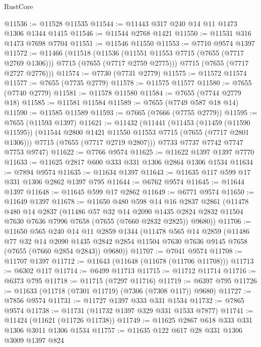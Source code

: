 \begin{lexlean}{RustCore}
\begin{coremodule}
@11536 := @11528 @11535
@11544 := @11443 @317 @240 @14 @11 @1473 @1306 @1344 @1415
@11546 := @11544 @2768 @1421
@11550 := @11531 @316 @1473 @7698 @7704
@11551 := @11546 @11550
@11553 := @7710 @9574 @1397
@11572 := @11466
    (@11518
      (@11536 (@11551 @11553 @7715 (@7655 (@7717 @2769 @1306))) @7715 (@7655 (@7717 @2759 @2775)))
      @7715
      (@7655 (@7717 @2727 @2776)))
@11574 := @7730 (@7731 @2779)
@11575 := @11572 @11574
@11577 := @7655 (@7735 @2779)
@11578 := @11575 @11577
@11580 := @7655 (@7740 @2779)
@11581 := @11578 @11580
@11584 := @7655 (@7744 @2779 @18)
@11585 := @11581 @11584
@11589 := @7655 (@7749 @587 @18 @14)
@11590 := @11585 @11589
@11593 := @7665 (@7666 (@7755 @2779))
@11595 := @7655 (@11593 @1397)
@11621 := @11432
    (@11441
      (@11453
        (@11459 (@11590 @11595))
        (@11544 @2800 @1421 @11550 @11553 @7715 (@7655 (@7717 @2801 @1306)))
        @7715
        (@7655 (@7717 @2719 @2807)))
      @7733
      @7737
      @7742
      @7747
      @7753
      @9747)
@11622 := @7766 @9574
@11625 := @11622 @1397 @1397 @7770
@11633 := @11625 @2817 @600 @333 @331 @1306 @2864 @1306 @1534
@11634 := @7894 @9574
@11635 := @11634 @1397
@11643 := @11635 @117 @599 @17 @331 @1306 @2862 @1397 @795
@11644 := @6762 @9574
@11645 := @11644 @1397
@11648 := @11645 @599 @17 @2862
@11649 := @6771 @9574
@11650 := @11649 @1397
@11678 := @11650
    @480
    @598
    @14
    @16
    @2837
    @2861
    (@11478
      @480
      @14
      @2837
      (@11486
        @57
        @32
        @14
        @2090
        @1435
        @2824
        @2832
        @11504
        @7630
        @7636
        @7996
        @7658
        (@7655 (@7660 @2832 @2825))
        @9680))
@11706 := @11650
    @565
    @240
    @14
    @11
    @2859
    @1344
    (@11478
      @565
      @14
      @2859
      (@11486
        @77
        @32
        @14
        @2090
        @1435
        @2842
        @2854
        @11504
        @7630
        @7636
        @9145
        @7658
        (@7655 (@7660 @2854 @2843))
        @9680))
@11707 := @7041 @9574
@11708 := @11707 @1397
@11712 := @11643 (@11648 (@11678 (@11706 @11708)))
@11713 := @6302 @117
@11714 := @6499 @11713
@11715 := @11712 @11714
@11716 := @6373 @795
@11718 := @11715 (@7297 @11716)
@11719 := @6397 @795
@11726 := @11633 (@11718 (@7301 @11719) (@7306 (@7308 @117)) @9680)
@11727 := @7856 @9574
@11731 := @11727 @1397 @333 @331 @1534
@11732 := @7865 @9574
@11738 := @11731 (@11732 @1397 @329 @331 @1533 @7877)
@11741 := @11424 (@11621 (@11726 @11738))
@11749 := @11625 @2867 @618 @333 @331 @1306 @3011 @1306 @1534
@11757 := @11635 @122 @617 @28 @331 @1306 @3009 @1397 @824

\end{coremodule}
\end{lexlean}
